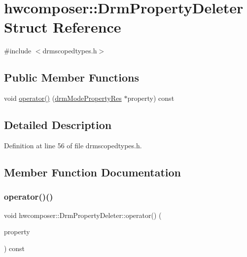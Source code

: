 \hypertarget{structhwcomposer_1_1DrmPropertyDeleter}{}\section{hwcomposer\+:\+:Drm\+Property\+Deleter Struct Reference}
\label{structhwcomposer_1_1DrmPropertyDeleter}


{\ttfamily \#include $<$drmscopedtypes.\+h$>$}

\subsection*{Public Member Functions}
\begin{DoxyCompactItemize}
\item 
void \mbox{\hyperlink{structhwcomposer_1_1DrmPropertyDeleter_a81b69451ae6918bb92a1fe4cdcb083ba}{operator()}} (\mbox{\hyperlink{drmscopedtypes_8h_a4fb7f6f576c5cfbc7ee86d566c5c8673}{drm\+Mode\+Property\+Res}} $\ast$property) const
\end{DoxyCompactItemize}


\subsection{Detailed Description}


Definition at line 56 of file drmscopedtypes.\+h.



\subsection{Member Function Documentation}
\mbox{\label{structhwcomposer_1_1DrmPropertyDeleter_a81b69451ae6918bb92a1fe4cdcb083ba}} 
\subsubsection{\texorpdfstring{operator()()}{operator()()}}
{\footnotesize\ttfamily void hwcomposer\+::\+Drm\+Property\+Deleter\+::operator() (\begin{DoxyParamCaption}\item[{\mbox{\hyperlink{drmscopedtypes_8h_a4fb7f6f576c5cfbc7ee86d566c5c8673}{drm\+Mode\+Property\+Res}} $\ast$}]{property }\end{DoxyParamCaption}) const}



